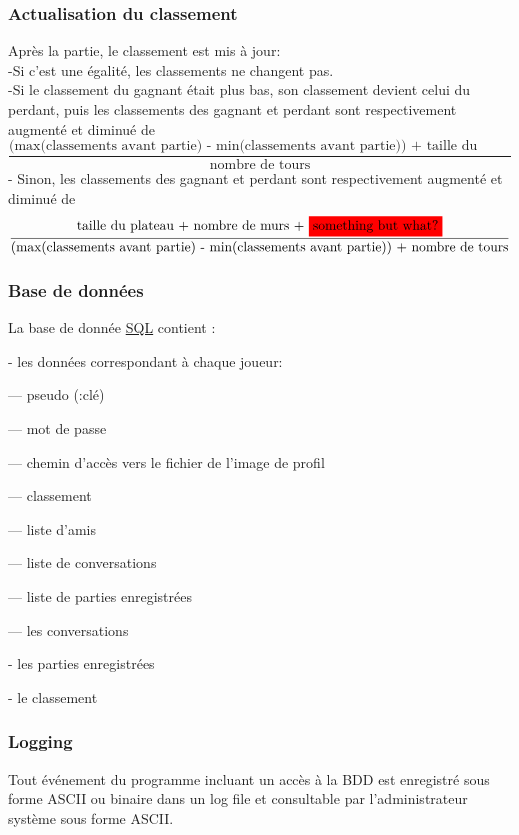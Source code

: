 \documentclass[french, utf8]{article}
\begin{document}
\subsubsection{Actualisation du classement}
\label{sec:ActualisationDuClassement}

Après la partie, le classement est mis à jour:
\\-Si c'est une égalité, les classements ne changent pas.
\\-Si le classement du gagnant était plus bas,
son classement devient celui du perdant, puis les classements des gagnant et perdant sont respectivement augmenté et diminué de
\[
 \frac{\text{(max(classements avant partie) - min(classements avant partie)) + taille du plateau + nombre de murs }}{\text{nombre de tours}}
\]
- Sinon,
les classements des gagnant et perdant sont respectivement augmenté et diminué de \\
\[
 \frac{\text{taille du plateau + nombre de murs + \colorbox{red}{something but what?}}}{\text{(max(classements avant partie) - min(classements avant partie)) + nombre de tours}}
\]

\subsubsection{Base de données}
\label{sec:BaseDeDonnées}

La base de donnée \href{https://en.wikipedia.org/wiki/SQL}{SQL} contient :
\item- les données correspondant à chaque joueur:
\item--- pseudo (:clé)
\item--- mot de passe %
\item--- chemin d'accès vers le fichier de l'image de profil
\item--- classement
\item--- liste d'amis
\item--- liste de conversations
\item--- liste de parties enregistrées

\item--- les conversations
\item- les parties enregistrées
\item- le classement

\subsubsection{Logging}
\label{sec:Logging}
Tout événement du programme incluant un accès à la BDD est enregistré sous forme ASCII ou binaire dans un log file et consultable par l'administrateur système sous forme ASCII.
\end{document}
